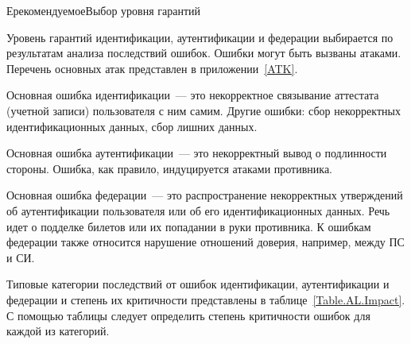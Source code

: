 \begin{appendix}{Е}{рекомендуемое}{Выбор уровня гарантий}\label{AL}

\label{AL.Errors}

Уровень гарантий идентификации, аутентификации и федерации выбирается 
по результатам анализа последствий ошибок. Ошибки могут быть вызваны атаками.
Перечень основных атак представлен в приложении~\ref{ATK}.

Основная ошибка идентификации~--- это некорректное связывание аттестата (учетной записи)
пользователя с ним самим. Другие ошибки: сбор некорректных 
идентификационных данных, сбор лишних данных.

Основная ошибка аутентификации~--- это некорректный вывод о подлинности 
стороны. Ошибка, как правило, индуцируется атаками противника.

Основная ошибка федерации~--- это распространение некорректных утверждений
об аутентификации пользователя или об его идентификационных данных. Речь идет о 
подделке билетов или их попадании в руки противника. К ошибкам федерации также 
относится нарушение отношений доверия, например, между ПС и СИ. 

\label{AL.Impact}

Типовые категории последствий от ошибок идентификации, аутентификации и 
федерации и степень их критичности представлены в 
таблице~\ref{Table.AL.Impact}. 
%
С помощью таблицы следует определить степень критичности ошибок для каждой из
категорий.


\end{appendix}
